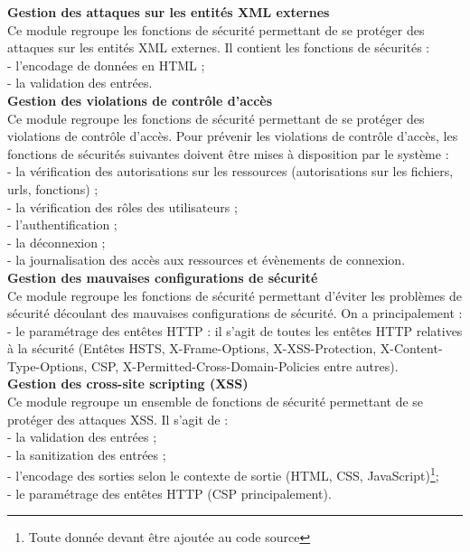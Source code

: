 \textbf{\RIGHTarrow Gestion des attaques sur les entités XML externes}\\
Ce module regroupe les fonctions de sécurité permettant de se protéger des attaques sur les entités XML externes. Il contient les fonctions de sécurités : \\
- l'encodage de données en HTML ; \\
- la validation des entrées.\\

\textbf{\RIGHTarrow Gestion des violations de contrôle d’accès}\\
Ce module regroupe les fonctions de sécurité permettant de se protéger des violations de contrôle d'accès. Pour prévenir les violations de contrôle d'accès, les fonctions de sécurités suivantes doivent être mises à disposition par le système : \\
- la vérification des autorisations sur les ressources (autorisations sur les fichiers, urls, fonctions) ; \\
- la vérification des rôles des utilisateurs ; \\
- l'authentification ; \\
- la déconnexion ; \\
- la journalisation des accès aux ressources et évènements de connexion.\\

\textbf{\RIGHTarrow Gestion des mauvaises configurations de sécurité}\\
Ce module regroupe les fonctions de sécurité permettant d'éviter les problèmes de sécurité découlant des mauvaises configurations de sécurité. On a principalement : \\
- le paramétrage des entêtes HTTP : il s'agit de toutes les entêtes HTTP relatives à la sécurité (Entêtes HSTS, X-Frame-Options, X-XSS-Protection, X-Content-Type-Options, CSP, X-Permitted-Cross-Domain-Policies entre autres). \\


\textbf{\RIGHTarrow Gestion des cross-site scripting (XSS)}\\
Ce module regroupe un ensemble de fonctions de sécurité permettant de se protéger des attaques XSS. Il s'agit de : \\
- la validation des entrées ;\\
- la sanitization des entrées ;\\
- l'encodage des sorties selon le contexte de sortie (HTML, CSS, JavaScript)\footnote{Toute donnée devant être ajoutée au code source}; \\
- le paramétrage des entêtes HTTP (CSP principalement).\\

